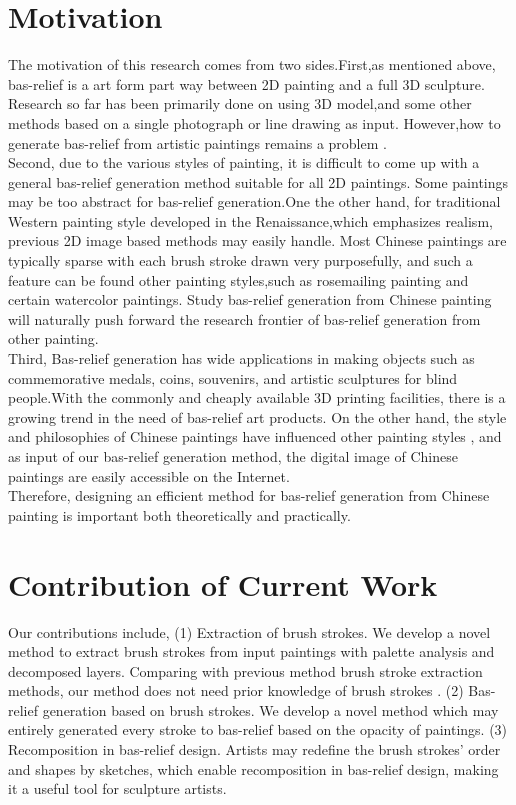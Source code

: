 \section{Motivation}
The motivation of this research comes from two sides.First,as mentioned above, bas-relief is a art form part way between 2D painting and a full 3D sculpture\cite{benzaid2017analysis}\cite{weyrich2007digital}\cite{kerber2009feature}\cite{kerber2012computer}\cite{zeng2014region}. Research so far has been primarily done on using 3D model,and some other methods based on a single photograph or line drawing as input. However,how to generate bas-relief from artistic paintings remains a problem .\\
Second, due to the various styles of painting, it is difficult to come up with a general bas-relief generation method suitable for all 2D paintings. Some paintings may be too abstract for bas-relief generation.One the other hand, for traditional Western painting style developed in the Renaissance,which emphasizes realism\cite{chu2004real}, previous 2D image based methods may easily handle. Most Chinese paintings are typically sparse with each brush stroke drawn very purposefully\cite{smith1997art}, and such a feature can be found other painting styles,such as rosemailing painting and certain watercolor paintings. Study bas-relief generation from Chinese painting will naturally push forward the research frontier of bas-relief generation from other painting. \\
Third, Bas-relief generation has wide applications in making objects such as commemorative medals, coins, souvenirs, and artistic sculptures for blind people.With the commonly and cheaply available 3D printing facilities, there is a growing trend in the need of bas-relief art products. On the other hand, the style and philosophies of Chinese paintings have influenced other painting styles \cite{chu2004real}, and as input of our bas-relief generation method, the digital image of Chinese paintings are easily accessible on the Internet.    \\
Therefore, designing an efficient method for bas-relief generation from Chinese painting is important both theoretically and practically.


\section{Contribution of Current Work}
Our contributions include,
\newline
(1) Extraction of brush strokes. We develop a novel method to extract brush strokes from input paintings with palette analysis and decomposed layers. Comparing with previous method brush stroke extraction methods, our method does not need prior knowledge of brush strokes .
\newline
(2) Bas-relief generation based on brush strokes. We develop a novel method which may entirely generated every stroke to  bas-relief based on the opacity of paintings.
\newline
(3) Recomposition in bas-relief design. Artists may redefine the brush strokes’ order and shapes by sketches, which enable recomposition in bas-relief design, making it a useful tool for sculpture artists.


